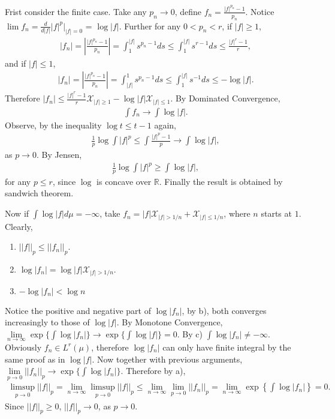 \documentclass[../main.tex]{subfiles}
\begin{document}
\begin{exercise}
\begin{enumerate}
      Frist consider the finite case.
      Take any $ p_n \to 0 $, define $ f_n = \frac {|f|^{p_n} - 1}{p_n} $. Notice $ \lim f_n = \frac {d}{d|f|} |f|^p| _{|f| = 0} $ = $ \log |f| $. Further for any $ 0 < p_n < r $, if $ |f| \ge 1 $,
      \begin{align*}
        |f_n| = \left | \frac {|f|^{p_n}  - 1}{p_n} \right| = \int _{1} ^{|f|} s ^{p_n-1} ds \le \int _{1} ^{|f|} s ^{r - 1}  ds \le \frac {|f|^r - 1}{r} ,
      \end{align*}
      and if $ |f| \le 1 $,
      \begin{align*}
        |f_n| = \left | \frac {|f|^{p_n} - 1}{p_n} \right| = \int _{|f|} ^{1} s ^{p_n-1} ds \le \int _{1} ^{|f|} s ^{-1} ds \le -\log|f|.
      \end{align*}
      Therefore $ |f_n| \le \frac {|f|^r - 1}{r}\mathcal{X} _{|f| \ge 1} - \log |f|\mathcal{X} _{|f| \le 1} $. By Dominated Convergence,
      \begin{align*}
        \int f_n \to \int \log |f|.
      \end{align*}
      Observe, by the inequality $ \log t \le t -1$ again,
      \begin{align*}
        \frac {1}{p} \log \int |f|^p \le \int \frac {|f|^p - 1}{p} \to \int \log |f|,
      \end{align*}
      as $ p \to 0 $.
      By Jensen,
      \begin{align*}
        \frac {1}{p} \log \int |f|^p \ge \int \log |f|,
      \end{align*}
      for any $ p \le r $, since $ \log $ is concave over $ \mathbb{R} $.
      Finally the result is obtained by sandwich theorem.

      Now if $ \int \log |f| d\mu = -\infty $, take $ f_n = |f|\mathcal{X}_{|f| > 1/n} + \mathcal{X}_{|f| \le 1/n} $, where $ n $ starts at $ 1 $. Clearly,
      \begin{enumerate}
        \item $ ||f||_p \le ||f_n||_p$.
        \item $ \log |f_n| = \log |f| \mathcal{X}_{|f| > 1/n} $.
        \item $ -\log |f_n| < \log n $
      \end{enumerate}
      Notice the positive and negative part of $ \log|f_n| $, by b), both converges increasingly to those of $ \log |f| $. By Monotone Convergence, $ \lim\limits _{n\to \infty} \exp \{\int \log |f_n|\} \to \exp \{\int \log |f|\} = 0  $. By c) $ \int \log |f_n| \ne -\infty $.
      Obviously $ f_n \in L ^{r}(\mu) $, therefore $ \log |f_n| $ can only have finite integral by the same proof as in $ \log |f| $.     Now together with previous arguments, $ \lim\limits _{p \to 0}  ||f_n||_p \to \exp \{\int \log |f_n|\} $.
      Therefore by a),
      \begin{align*}
        \limsup _{p\to 0} ||f||_p = \lim _{n\to \infty} \limsup _{p \to 0} ||f||_p \le \lim _{n\to \infty} \lim _{p \to 0} ||f_n||_p = \lim _{n\to \infty} \exp\left \{\int \log |f_n|\right \} = 0.
      \end{align*}
      Since $ ||f||_p \ge 0$, $ ||f||_p \to 0 $, as $ p \to 0 $.
    \end{enumerate}


  \end{exercise}
 
\end{document}
